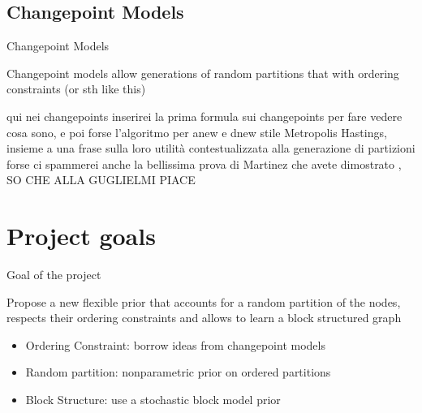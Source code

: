 \subsection{Changepoint Models}
\begin{frame}{Changepoint Models}

Changepoint models allow generations of random partitions that with ordering constraints (or sth like this)

qui nei changepoints inserirei la prima formula sui changepoints 
per fare vedere cosa sono, e poi forse l'algoritmo per anew e dnew stile Metropolis Hastings, insieme a una frase sulla loro utilità contestualizzata alla generazione di partizioni
forse ci spammerei anche la bellissima prova di Martinez che avete dimostrato , SO CHE ALLA GUGLIELMI PIACE


\end{frame}








\section{Project goals}


\begin{frame}[containsverbatim]{Goal of the project}

Propose a \alert {new flexible prior that accounts for a random partition of the nodes}, respects their ordering constraints and allows to learn a block structured graph

 \begin{itemize}
     \item Ordering Constraint: borrow ideas from changepoint models
     \item Random partition: nonparametric prior on ordered partitions
     \item Block Structure: use a stochastic block model prior
 \end{itemize}



\end{frame}

